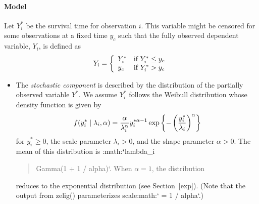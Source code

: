 \documentclass[letterpaper,10pt,english]{sphinxmanual}
\begin{document}
\paragraph{Model}
\label{zelig-weibull:model}
Let \(Y_i^*\) be the survival time for observation \(i\). This
variable might be censored for some observations at a fixed time
\(y_c\) such that the fully observed dependent variable,
\(Y_i\), is defined as
\begin{gather}
\begin{split}Y_i = \left\{ \begin{array}{ll}
      Y_i^* & \textrm{if }Y_i^* \leq y_c \\
      y_c & \textrm{if }Y_i^* > y_c
    \end{array} \right.\end{split}\notag
\end{gather}\begin{itemize}
\item {} 
The \emph{stochastic component} is described by the distribution of the
partially observed variable \(Y^*\). We assume \(Y_i^*\)
follows the Weibull distribution whose density function is given by
\begin{gather}
\begin{split}f(y_i^*\mid \lambda_i, \alpha) = \frac{\alpha}{\lambda_i^\alpha}
    y_i^{* \alpha-1} \exp \left\{ -\left( \frac{y_i^*}{\lambda_i}
\right)^{\alpha} \right\}\end{split}\notag
\end{gather}
for \(y_i^* \ge 0\), the scale parameter \(\lambda_i > 0\),
and the shape parameter \(\alpha > 0\). The mean of this
distribution is :math:{\color{red}\bfseries{}{}`}lambda\_i
\begin{quote}

Gamma(1 + 1 / alpha){}`. When \(\alpha = 1\), the distribution
\end{quote}

reduces to the exponential distribution (see Section {[}exp{]}). (Note
that the output from zelig() parameterizes
scale:math:{}` = 1 / alpha{}`.)


\end{itemize}
\end{document}
